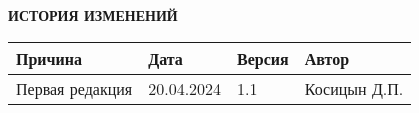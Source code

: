 	\begin{center}
		\large \textbf{ИСТОРИЯ ИЗМЕНЕНИЙ} \normalsize
	\end{center}
\begin{longtable}{|p{70mm}|p{20mm}|p{20mm}|p{50mm}|}
\hline
{\bf \parbox[c][5mm]{70mm}{\centering Причина}} & {\bf \parbox[c]{20mm}{\centering Дата}} & {\bf \parbox[c]{20mm}{\centering Версия}} & {\bf \parbox[c]{50mm}{\centering Автор}} \\
\hline
\parbox[c][9mm]{70mm}{Первая редакция} & {\parbox{20mm}{20.04.2024}} & \parbox{20mm}{1.1} & {\parbox{50mm}{Косицын Д.П.}} \\
\hline
\end{longtable}  
	
\newpage